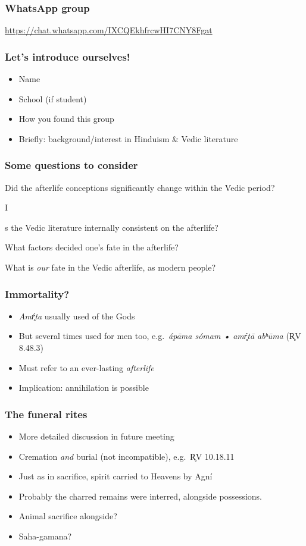 \documentclass[pdf]{beamer}
\newcommand{\Subitem}[1]{{\setlength\itemindent{12pt} \item[-] #1}}
\begin{document}
\begin{frame} \frametitle{WhatsApp group}
\begin{center}
	\href{https://chat.whatsapp.com/IXCQEkhfrcwHI7CNY8Fgat}{https://chat.whatsapp.com/IXCQEkhfrcwHI7CNY8Fgat}
\end{center}
\end{frame}

\begin{frame} \frametitle{Let's introduce ourselves!}
\begin{itemize}
	\item Name
	\item School (if student)
	\item How you found this group
	\item Briefly: background/interest in Hinduism \& Vedic literature
\end{itemize}
\end{frame}

\begin{frame}[label=questions] \frametitle{Some questions to consider}
\begin{itemize}
	\item Did the afterlife conceptions significantly change within the Vedic period?
	\Subitem Is the Vedic literature internally consistent on the afterlife?
	\item What factors decided one's fate in the afterlife?
	\item What is \emph{our} fate in the Vedic afterlife, as modern people?
\end{itemize}
\end{frame}

\begin{frame} \frametitle{Immortality?}
\begin{itemize}
	\item \textit{Amŕ̥ta} usually used of the Gods
	\item But several times used for men too, e.g.~\textit{ápāma sómam • amŕ̥tā abʰūma} (R̥V 8.48.3)
	\item Must refer to an ever-lasting \emph{afterlife}
	\item Implication: annihilation is possible
\end{itemize}
\end{frame}

\begin{frame} \frametitle{The funeral rites}
\begin{itemize}
	\item More detailed discussion in future meeting
	\item Cremation \emph{and} burial (not incompatible), e.g.~R̥V 10.18.11
	\item Just as in sacrifice, spirit carried to Heavens by Agní
	\item Probably the charred remains were interred, alongside possessions.
	\item Animal sacrifice alongside?
	\item Saha-gamana?
\end{itemize}
\end{frame}
\end{document}
